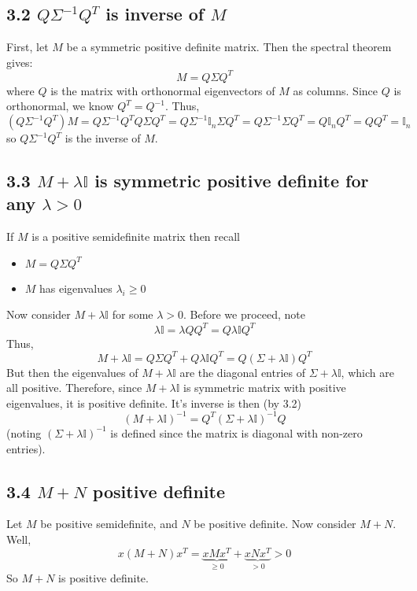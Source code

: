 \documentclass[paper=a4, fontsize=11pt]{scrartcl} %
\numberwithin{equation}{section} %
\numberwithin{figure}{section} %
\numberwithin{table}{section} %
\begin{document}
\subsection*{3.2 $Q\Sigma^{-1}Q^T$ is inverse of $M$}

First, let $M$ be a symmetric positive definite matrix. Then the spectral theorem gives:
\[M = Q \Sigma Q^T\]
where $Q$ is the matrix with orthonormal eigenvectors of $M$ as columns. Since $Q$ is orthonormal, we know $Q^T = Q^{-1}$. Thus,
\[(Q \Sigma^{-1} Q^T) M = Q \Sigma^{-1} Q^T Q \Sigma Q^T = Q \Sigma^{-1} \mathbb{I}_n \Sigma Q^T = Q \Sigma^{-1}\Sigma Q^T = Q \mathbb{I}_n Q^T = Q Q^T = \mathbb{I}_n\]
so $Q\Sigma^{-1}Q^T$ is the inverse of $M$.

\subsection*{3.3 $M + \lambda \mathbb{I}$ is symmetric positive definite for any $\lambda > 0$}

If $M$ is a positive semidefinite matrix then recall
\begin{itemize}
\item $M = Q \Sigma Q^T$
\item $M$ has eigenvalues $\lambda_i \geq 0$
\end{itemize}
Now consider $M + \lambda \mathbb{I}$ for some $\lambda > 0$. Before we proceed, note
\[\lambda \mathbb{I} = \lambda Q Q^T = Q \lambda \mathbb{I} Q^T \] 
Thus,
\[M + \lambda \mathbb{I} = Q \Sigma Q^T + Q \lambda \mathbb{I} Q^T = Q(\Sigma + \lambda \mathbb{I})Q^T\]
But then the eigenvalues of $M + \lambda \mathbb{I}$ are the diagonal entries of $\Sigma + \lambda \mathbb{I}$, which are all positive. Therefore, since $M + \lambda \mathbb{I}$ is symmetric matrix with positive eigenvalues, it is positive definite. It's inverse is then (by 3.2)
\[(M + \lambda \mathbb{I})^{-1} = Q^T (\Sigma + \lambda \mathbb{I})^{-1} Q\]
(noting $(\Sigma + \lambda \mathbb{I})^{-1}$ is defined since the matrix is diagonal with non-zero entries).

\subsection*{3.4 $M+N$ positive definite}

Let $M$ be positive semidefinite, and $N$ be positive definite. Now consider $M + N$. Well,
\[x(M + N)x^T = \underbrace{xMx^T}_{\geq 0} + \underbrace{xNx^T}_{>0} > 0\]
So $M + N$ is positive definite.
\end{document}
